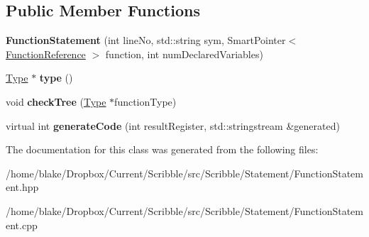 \subsection*{Public Member Functions}
\begin{DoxyCompactItemize}
\item 
\hypertarget{class_scribble_core_1_1_function_statement_a817ae8168af58d2c70d8539db2b6982a}{{\bfseries Function\-Statement} (int line\-No, std\-::string sym, Smart\-Pointer$<$ \hyperlink{class_scribble_core_1_1_function_reference}{Function\-Reference} $>$ function, int num\-Declared\-Variables)}\label{class_scribble_core_1_1_function_statement_a817ae8168af58d2c70d8539db2b6982a}

\item 
\hypertarget{class_scribble_core_1_1_function_statement_aa76d271600b3472b23579f3646b8943c}{\hyperlink{class_scribble_core_1_1_type}{Type} $\ast$ {\bfseries type} ()}\label{class_scribble_core_1_1_function_statement_aa76d271600b3472b23579f3646b8943c}

\item 
\hypertarget{class_scribble_core_1_1_function_statement_ac9cf13bb2f9f5de5a111bd0e724b4796}{void {\bfseries check\-Tree} (\hyperlink{class_scribble_core_1_1_type}{Type} $\ast$function\-Type)}\label{class_scribble_core_1_1_function_statement_ac9cf13bb2f9f5de5a111bd0e724b4796}

\item 
\hypertarget{class_scribble_core_1_1_function_statement_adaea8ad07146397495bf37eccff6156c}{virtual int {\bfseries generate\-Code} (int result\-Register, std\-::stringstream \&generated)}\label{class_scribble_core_1_1_function_statement_adaea8ad07146397495bf37eccff6156c}

\end{DoxyCompactItemize}


The documentation for this class was generated from the following files\-:\begin{DoxyCompactItemize}
\item 
/home/blake/\-Dropbox/\-Current/\-Scribble/src/\-Scribble/\-Statement/Function\-Statement.\-hpp\item 
/home/blake/\-Dropbox/\-Current/\-Scribble/src/\-Scribble/\-Statement/Function\-Statement.\-cpp\end{DoxyCompactItemize}
